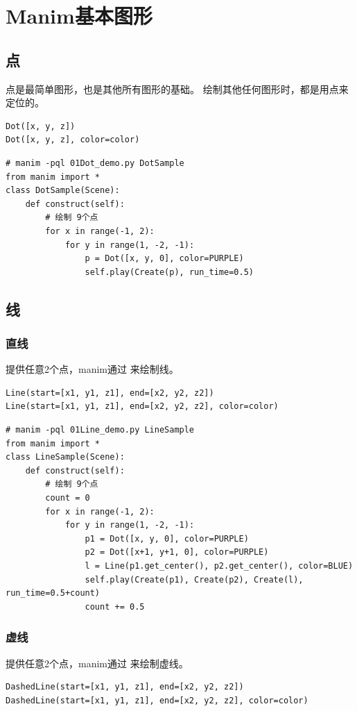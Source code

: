 \chapter{Manim基本图形}
\section{点}
点是最简单图形，也是其他所有图形的基础。 绘制其他任何图形时，都是用点来定位的。

\begin{lstlisting}[style=demostyle,numbers=none]
Dot([x, y, z])
Dot([x, y, z], color=color)
\end{lstlisting}    

\begin{lstlisting}[style=pythonstyle]
# manim -pql 01Dot_demo.py DotSample    
from manim import *
class DotSample(Scene):
    def construct(self):
        # 绘制 9个点
        for x in range(-1, 2):
            for y in range(1, -2, -1):
                p = Dot([x, y, 0], color=PURPLE)
                self.play(Create(p), run_time=0.5)
\end{lstlisting}                

\section{线}
\subsection{直线}
提供任意2个点，manim通过  来绘制线。
\begin{lstlisting}[style=demostyle,numbers=none]
Line(start=[x1, y1, z1], end=[x2, y2, z2])
Line(start=[x1, y1, z1], end=[x2, y2, z2], color=color)
\end{lstlisting}
\begin{lstlisting}[style=pythonstyle]
# manim -pql 01Line_demo.py LineSample    
from manim import *
class LineSample(Scene):
    def construct(self):
        # 绘制 9个点
        count = 0
        for x in range(-1, 2):
            for y in range(1, -2, -1):
                p1 = Dot([x, y, 0], color=PURPLE)
                p2 = Dot([x+1, y+1, 0], color=PURPLE)
                l = Line(p1.get_center(), p2.get_center(), color=BLUE)
                self.play(Create(p1), Create(p2), Create(l), run_time=0.5+count)
                count += 0.5
\end{lstlisting}    

\subsection{虚线}
提供任意2个点，manim通过  来绘制虚线。
\begin{lstlisting}[style=demostyle,numbers=none]
DashedLine(start=[x1, y1, z1], end=[x2, y2, z2])
DashedLine(start=[x1, y1, z1], end=[x2, y2, z2], color=color)
\end{lstlisting}

